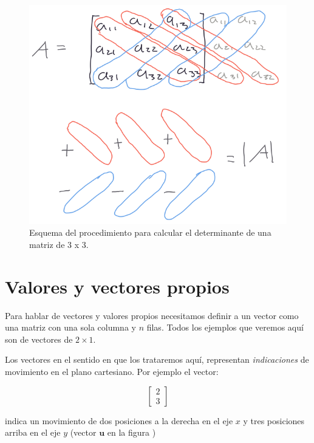 \documentclass[
]{book}
\begin{document}
\begin{figure}

{\centering \includegraphics{Unidad-II/determ} 

}

\caption{Esquema del procedimiento para calcular el determinante de una matriz de 3 x 3.}\label{fig:det-3}
\end{figure}

\hypertarget{valores-y-vectores-propios}{%
\section{Valores y vectores propios}\label{valores-y-vectores-propios}}

Para hablar de vectores y valores propios necesitamos definir a un vector como una matriz con una sola columna y \(n\) filas. Todos los ejemplos que veremos aquí son de vectores de \(2 \times 1\).

Los vectores en el sentido en que los trataremos aquí, representan \emph{indicaciones} de movimiento en el plano cartesiano. Por ejemplo el vector:

\[\left[ 
\begin{array}{cc}
2 \\ 3
\end{array}
\right]\]

indica un movimiento de dos posiciones a la derecha en el eje \(x\) y tres posiciones arriba en el eje \(y\) (vector \(\mathbf{u}\) en la figura )
\end{document}
